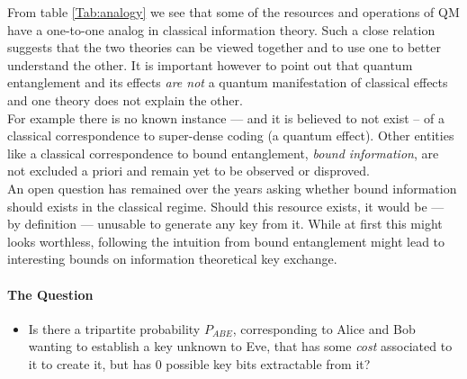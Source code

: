 From table \ref{Tab:analogy} we see that some of the resources and operations of QM have a one-to-one analog in classical information theory. 
Such a close relation suggests that the two theories can be viewed together and to use one to better understand the other. 
It is important however to point out that quantum entanglement and its effects \emph{are not} a quantum manifestation of classical effects and one theory does not explain the other. \\
For example there is no known instance --- and it is believed to not exist -- of a classical correspondence to super-dense coding (a quantum effect). Other entities like a classical correspondence to bound entanglement, \emph{bound information}, are not excluded a priori and remain yet to be observed or disproved.\\

An open question has remained over the years asking whether bound information should exists in the classical regime.
Should this resource exists, it would be --- by definition --- unusable to generate any key from it.
While at first this might looks worthless, 
following the intuition from bound entanglement might lead to interesting bounds on information theoretical key exchange.\\

\paragraph*{The Question}
\begin{itemize}
		\item[] Is there a tripartite probability $P_{ABE}$, corresponding to Alice and Bob wanting to establish a key unknown to Eve, that has some \emph{cost} associated to it to create it, but has $0$ possible key bits extractable from it? 
\end{itemize}


	